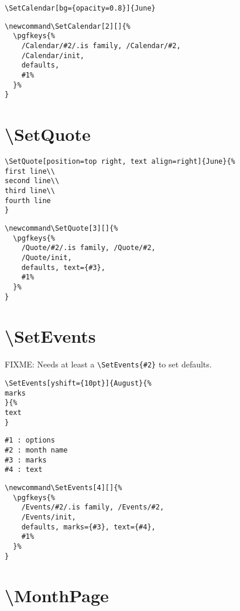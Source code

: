 \documentclass[11pt,oneside]{memoir-article}
\begin{document}
\begin{verbatim}
\SetCalendar[bg={opacity=0.8}]{June}
\end{verbatim}

\begin{verbatim}
\newcommand\SetCalendar[2][]{%
  \pgfkeys{%
    /Calendar/#2/.is family, /Calendar/#2,
    /Calendar/init,
    defaults,
    #1%
  }%
}
\end{verbatim}

\section{\textbackslash SetQuote}
\label{sec-9-3}

\begin{verbatim}
\SetQuote[position=top right, text align=right]{June}{%
first line\\
second line\\
third line\\
fourth line
}
\end{verbatim}

\begin{verbatim}
\newcommand\SetQuote[3][]{%
  \pgfkeys{%
    /Quote/#2/.is family, /Quote/#2,
    /Quote/init,
    defaults, text={#3},
    #1%
  }%
}
\end{verbatim}

\section{\textbackslash SetEvents}
\label{sec-9-4}

FIXME: Needs at least a \texttt{\textbackslash{}SetEvents\{\#2\}} to set defaults.

\begin{verbatim}
\SetEvents[yshift={10pt}]{August}{%
marks
}{%
text
}
\end{verbatim}

\begin{verbatim}
#1 : options
#2 : month name
#3 : marks
#4 : text
\end{verbatim}

\begin{verbatim}
\newcommand\SetEvents[4][]{%
  \pgfkeys{%
    /Events/#2/.is family, /Events/#2,
    /Events/init,
    defaults, marks={#3}, text={#4},
    #1%
  }%
}
\end{verbatim}

\section{\textbackslash MonthPage}
\label{sec-9-5}
\end{document}
